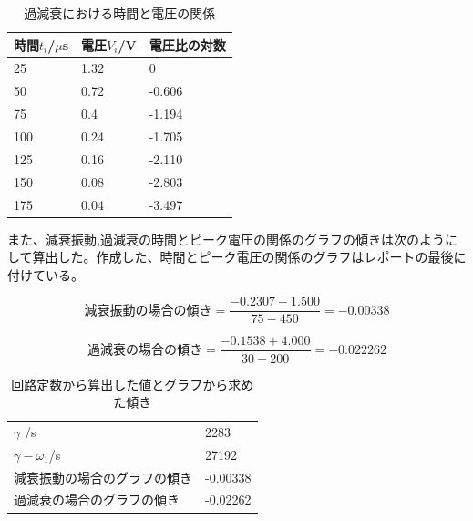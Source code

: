 \documentclass{jsarticle}
\begin{document}
\begin{table}[H]
\centering
\caption{過減衰における時間と電圧の関係}
\label{my-label}
\begin{tabular}{lll}
\hline
    時間$t_i$/$\mu$s & 電圧$V_i$/V & 電圧比の対数 \\ \hline
    25     & 1.32   & 0      \\
    50     & 0.72   & -0.606 \\
    75     & 0.4    & -1.194 \\
    100    & 0.24   & -1.705 \\
    125    & 0.16   & -2.110 \\
    150    & 0.08   & -2.803 \\
    175    & 0.04   & -3.497 \\
\end{tabular}
\end{table}

また、減衰振動,過減衰の時間とピーク電圧の関係のグラフの傾きは次のようにして算出した。作成した、時間とピーク電圧の関係のグラフはレポートの最後に付けている。

\begin{equation}
    減衰振動の場合の傾き = \frac{-0.2307+1.500}{75-450} = -0.00338
\end{equation}

\begin{equation}
    過減衰の場合の傾き = \frac{-0.1538+4.000}{30-200} = -0.022262
\end{equation}

\begin{table}[H]
\centering
\caption{回路定数から算出した値とグラフから求めた傾き}
\label{my-label}
\begin{tabular}{|l|l|}
$\gamma$ /s        & 2283     \\
$\gamma - \omega_1$/s & 27192    \\
減衰振動の場合のグラフの傾き    & -0.00338 \\
過減衰の場合のグラフの傾き     & -0.02262
\end{tabular}
\end{table}
\end{document}
